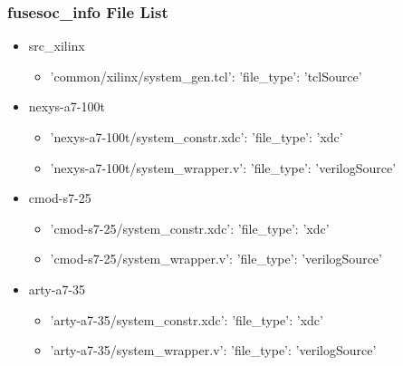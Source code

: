 \subsubsection{fusesoc\_info File List}
\begin{itemize}
\item src\_xilinx
	\begin{itemize}
	\item {'common/xilinx/system\_gen.tcl': {'file\_type': 'tclSource'}}
	\end{itemize}
\item nexys-a7-100t
	\begin{itemize}
	\item {'nexys-a7-100t/system\_constr.xdc': {'file\_type': 'xdc'}}
	\item {'nexys-a7-100t/system\_wrapper.v': {'file\_type': 'verilogSource'}}
	\end{itemize}
\item cmod-s7-25
	\begin{itemize}
	\item {'cmod-s7-25/system\_constr.xdc': {'file\_type': 'xdc'}}
	\item {'cmod-s7-25/system\_wrapper.v': {'file\_type': 'verilogSource'}}
	\end{itemize}
\item arty-a7-35
	\begin{itemize}
	\item {'arty-a7-35/system\_constr.xdc': {'file\_type': 'xdc'}}
	\item {'arty-a7-35/system\_wrapper.v': {'file\_type': 'verilogSource'}}
	\end{itemize}
\end{itemize}
